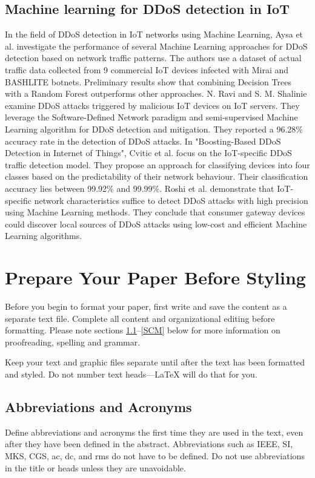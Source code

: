 \documentclass[conference]{IEEEtran}
\begin{document}
\subsection{Machine learning for DDoS detection in IoT}
In the field of DDoS detection in IoT networks using Machine Learning, Aysa et al. investigate the performance of several Machine Learning approaches for DDoS detection based on network traffic patterns.
The authors use a dataset of actual traffic data collected from 9 commercial IoT devices infected with Mirai and BASHLITE botnets.
Preliminary results show that combining Decision Trees with a Random Forest outperforms other approaches.
N. Ravi and S. M. Shalinie examine DDoS attacks triggered by malicious IoT devices on IoT servers.
They leverage the Software-Defined Network paradigm and semi-supervised Machine Learning algorithm for DDoS detection and mitigation.
They reported a 96.28\% accuracy rate in the detection of DDoS attacks.
In "Boosting-Based DDoS Detection in Internet of Things", Cvitic et al. focus on the IoT-specific DDoS traffic detection model.
They propose an approach for classifying devices into four classes based on the predictability of their network behaviour.
Their classification accuracy lies between 99.92\% and 99.99\%.
Roshi et al. demonstrate that IoT-specific network characteristics suffice to detect DDoS attacks with high precision using Machine Learning methods.
They conclude that consumer gateway devices could discover local sources of DDoS attacks using low-cost and efficient Machine Learning algorithms.

\section{Prepare Your Paper Before Styling}
Before you begin to format your paper, first write and save the content as a
separate text file. Complete all content and organizational editing before
formatting. Please note sections \ref{AA}--\ref{SCM} below for more information on 
proofreading, spelling and grammar.

Keep your text and graphic files separate until after the text has been 
formatted and styled. Do not number text heads---{\LaTeX} will do that 
for you.

\subsection{Abbreviations and Acronyms}\label{AA}
Define abbreviations and acronyms the first time they are used in the text, 
even after they have been defined in the abstract. Abbreviations such as 
IEEE, SI, MKS, CGS, ac, dc, and rms do not have to be defined. Do not use 
abbreviations in the title or heads unless they are unavoidable.
\end{document}
